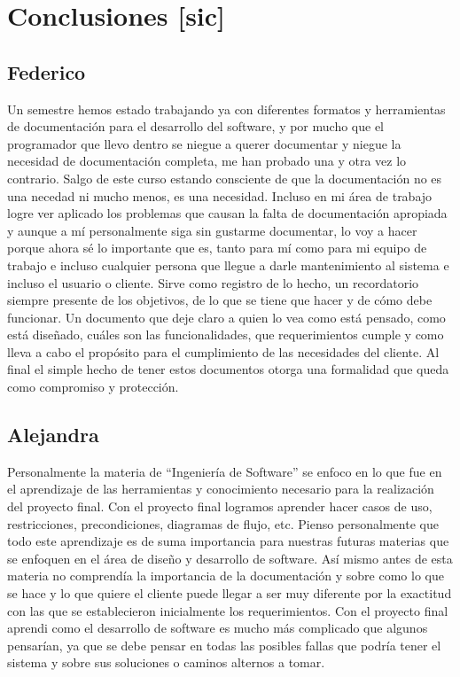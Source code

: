 \documentclass{scrreprt}
\begin{document}



\glsaddallunused
\printglossaries

\chapter{Conclusiones [sic]}
\section{Federico}
Un semestre hemos estado trabajando ya con diferentes formatos y herramientas de documentación para el desarrollo del software, y por mucho que el programador que llevo dentro se niegue a querer documentar y niegue la 
necesidad de documentación completa, me han probado una y otra vez lo contrario. Salgo de este curso estando consciente de que la documentación no es una necedad ni mucho menos, es una necesidad.
Incluso en mi área de trabajo logre ver aplicado los problemas que causan la falta de documentación apropiada y aunque a mí personalmente siga sin gustarme documentar, lo voy a hacer porque ahora sé lo importante que 
es, tanto para mí como para mi equipo de trabajo e incluso cualquier persona que llegue a darle mantenimiento al sistema e incluso el usuario o cliente.
Sirve como registro de lo hecho, un recordatorio siempre presente de los objetivos, de lo que se tiene que hacer y de cómo debe funcionar. Un documento que deje claro a quien lo vea como está pensado, como está 
diseñado, cuáles son las funcionalidades, que requerimientos cumple y como lleva a cabo el propósito para el cumplimiento de las necesidades del cliente. Al final el simple hecho de tener estos documentos otorga una 
formalidad que queda como compromiso y protección.

\section{Alejandra}
Personalmente la materia de “Ingeniería de Software” se enfoco en lo que fue en el aprendizaje de las herramientas y conocimiento necesario para la realización del proyecto final. Con el proyecto final logramos aprender 
hacer casos de uso, restricciones, precondiciones, diagramas de flujo, etc. Pienso personalmente que todo este aprendizaje es de suma importancia para nuestras futuras materias que se enfoquen en el área de diseño y 
desarrollo de software. Así mismo antes de esta materia no comprendía la importancia de la documentación y sobre como lo que se hace y lo que quiere el cliente puede llegar a ser muy diferente por la exactitud con las 
que se establecieron inicialmente los requerimientos. Con el proyecto final aprendi como el desarrollo de software es mucho más complicado que algunos pensarían, ya que se debe pensar en todas las posibles fallas que 
podría tener el sistema y sobre sus soluciones o caminos alternos a tomar.
\end{document}
